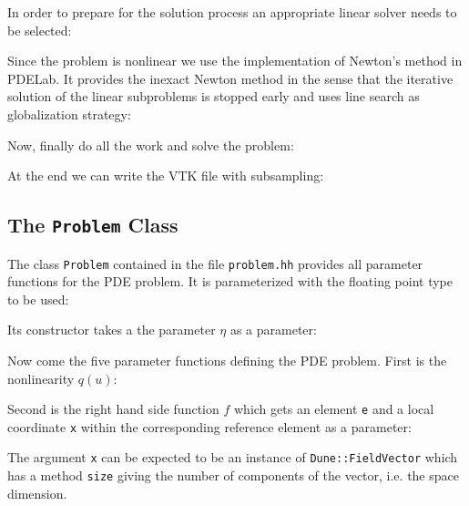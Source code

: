 \documentclass[a4paper,12pt]{article}
\begin{document}
In order to prepare for the solution process an appropriate
linear solver needs to be selected:


Since the problem is nonlinear we use the implementation of
Newton's method in PDELab. It provides the inexact Newton method
in the sense that the iterative solution of the linear subproblems is
stopped early and uses line search as globalization strategy:


Now, finally do all the work and solve the problem:


At the end we can write the VTK file with subsampling:


\subsection{The \lstinline{Problem} Class}

The class \lstinline{Problem} contained in the file \lstinline{problem.hh}
provides all parameter functions for the PDE problem. It is parameterized
with the floating point type to be used:

Its constructor takes a the parameter $\eta$ as a parameter:

Now come the five parameter functions defining the PDE problem.
First is the nonlinearity $q(u)$:

Second is the right hand side function $f$ which gets
an element \lstinline{e} and a local coordinate \lstinline{x} within
the corresponding reference element as a parameter:

The argument \lstinline{x} can be expected to be an instance
of \lstinline{Dune::FieldVector} which has a method \lstinline{size}
giving the number of components of the vector, i.e. the space dimension.
\end{document}

